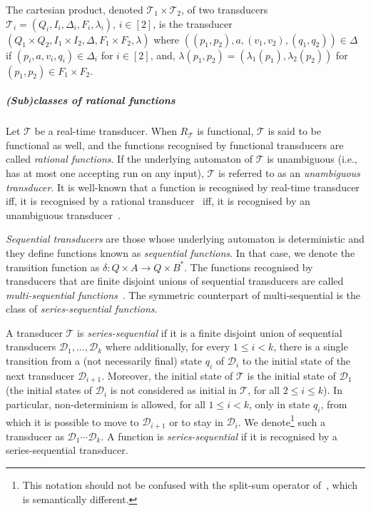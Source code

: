\documentclass[a4paper,UKenglish,cleveref, autoref, thm-restate,authorcolumns, colorlinks]{lipics-v2021}
\newcommand\calD{\mathcal{D}}
\newcommand\calT{\mathcal{T}}
\begin{document}
 
  The cartesian product, denoted $\calT_1 \times \calT_2$,
  of two transducers $\calT_i = (Q_i, I_i,\Delta_i, F_i, \lambda_i)$, $i\in[2]$, is the transducer $(Q_1 \times Q_2, I_1 \times I_2,\Delta, F_1 \times F_2, \lambda)$  where $((p_1,p_2),a,(v_1,v_2),(q_1,q_2)) \in \Delta$ if $(p_i,a,v_i,q_i) \in \Delta_i$ for $i \in [2]$, and, $\lambda(p_1,p_2) = (\lambda_1(p_1),\lambda_2(p_2))$ for $(p_1,p_2) \in F_1 \times F_2$.

\subparagraph*{(Sub)classes of rational functions} Let $\calT$ be a real-time transducer. When $R_\calT$ is functional, $\calT$ is said to be functional as well, and the functions recognised by functional transducers are called \emph{rational functions}. If the underlying automaton of $\calT$ is unambiguous (i.e., has at most one accepting run on any input), $\calT$ is referred to as an \emph{unambiguous transducer}. It is well-known that a function is recognised by real-time transducer iff, it is recognised by a rational transducer~\cite{Berstel} iff, it is recognised by an unambiguous transducer~\cite{eilenberg1974automata}.


\emph{Sequential transducers} are those whose underlying automaton is deterministic and they define functions known as \emph{sequential functions}. In that case, we denote the transition function as $\delta : Q\times A\rightarrow Q\times B^*$. The functions recognised by transducers that are
finite disjoint unions of sequential transducers are called \emph{multi-sequential functions}~\cite{DBLP:conf/stacs/ChoffrutS86,DBLP:journals/ijfcs/JeckerF18}. The symmetric counterpart of multi-sequential is the class of \emph{series-sequential functions}.


A transducer $\calT$ is \emph{series-sequential} if it is a finite disjoint union of sequential transducers $\calD_1, \ldots , \calD_k$
where additionally, for every $1 \leq i < k$,  there is
a single transition from a (not necessarily final) state $q_i$ of $\calD_i$
to the initial state of the next transducer $\calD_{i+1}$. Moreover, the initial state of $\calT$ is the initial state of $\calD_1$ (the initial states of $\calD_i$ is not considered as initial in $\calT$, for all $2\leq i\leq k$).
In particular, non-determinism is allowed, for all $1\leq i<k$, only in state $q_i$, from which it is possible to move to $\calD_{i+1}$ or to stay in $\calD_i$. We denote\footnote{This notation should not be confused with the split-sum operator of~\cite{DBLP:conf/csl/AlurFR14}, which is semantically different.} such a transducer as $\calD_1 \cdots \calD_k$.
A function is \emph{series-sequential} if it is recognised
by a series-sequential transducer.
\end{document}
